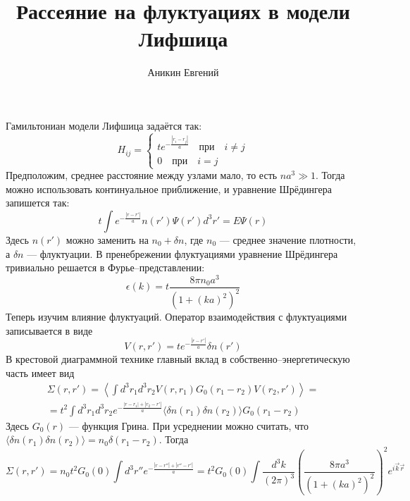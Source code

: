 \documentclass{article}
\title{Рассеяние на флуктуациях в модели Лифшица}
\author{Аникин Евгений}
\begin{document}
\maketitle
    Гамильтониан модели Лифшица задаётся так:
    \begin{equation}
        H_{ij} = \left\{\begin{matrix}
                    t e^{-\frac{|r_i - r_j|}{a}} \quad \text{при} \quad i\ne j \\
                    0 \quad \text{при} \quad i = j
                 \end{matrix}\right.
    \end{equation}
    Предположим, среднее расстояние между узлами мало, то есть $na^3 \gg 1$. Тогда можно
    использовать континуальное приближение, и уравнение Шрёдингера запишется так:
    \begin{equation}
        t\int e^{-\frac{|r - r'|}{a}} n(r') \Psi(r') d^3 r' = E\Psi(r)
    \end{equation}
    Здесь $n(r')$ 
    можно заменить на $n_0 + \delta n$, где $n_0$ --- среднее значение плотности, а 
    $\delta n$ --- флуктуации. В пренебрежении флуктуациями уравнение Шрёдингера тривиально
    решается в Фурье--представлении:
    \begin{equation}
        \epsilon(k) = t \frac{8\pi n_0a^3}{(1 + (ka)^2)^2}
    \end{equation}
    Теперь изучим влияние флуктуаций. Оператор взаимодействия
    с флуктуациями записывается в виде
    \begin{equation}
        V(r,r') = te^{-\frac{|r - r'|}{a}} \delta n(r')
    \end{equation}
    В крестовой диаграммной технике главный вклад в собственно--энергетическую часть имеет вид
    \begin{multline}
         \Sigma(r,r') = \left\langle \int d^3 r_1 d^3 r_2 V(r,r_1)G_0(r_1-r_2) V(r_2,r') 
                        \right\rangle = \\
                        = t^2\int d^3 r_1 d^3 r_2 e^{-\frac{|r - r_1| + |r_2 - r'|}{a}}
                        \langle \delta n(r_1) \delta n(r_2) \rangle G_0(r_1-r_2) 
    \end{multline}
    Здесь $G_0(r)$ --- функция Грина. При усреднении можно считать, что 
    $\langle \delta n(r_1) \delta n(r_2) \rangle = n_0 \delta(r_1 - r_2)$. Тогда 
    \begin{equation}
        \Sigma(r,r')= n_0t^2G_0(0)\int d^3 r'' e^{-\frac{|r - r''| + |r'' - r'|}{a}} =
                       t^2G_0(0) \int \frac{d^3 k}{(2\pi)^3} 
                            \left(\frac{8\pi a^3 }{(1 + (ka)^2)^2}\right)^2 e^{i\vec{k}\vec{r}}
    \end{equation}
\end{document}
